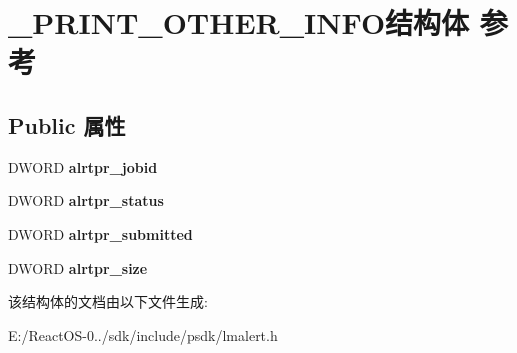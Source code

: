 \hypertarget{struct___p_r_i_n_t___o_t_h_e_r___i_n_f_o}{}\section{\+\_\+\+P\+R\+I\+N\+T\+\_\+\+O\+T\+H\+E\+R\+\_\+\+I\+N\+F\+O结构体 参考}
\label{struct___p_r_i_n_t___o_t_h_e_r___i_n_f_o}
\subsection*{Public 属性}
\begin{DoxyCompactItemize}
\item 
\mbox{\label{struct___p_r_i_n_t___o_t_h_e_r___i_n_f_o_a24254f1208283a9a54aa9f4e38cd9dd4}} 
D\+W\+O\+RD {\bfseries alrtpr\+\_\+jobid}
\item 
\mbox{\label{struct___p_r_i_n_t___o_t_h_e_r___i_n_f_o_adade3356e8018f015ed37f6183468260}} 
D\+W\+O\+RD {\bfseries alrtpr\+\_\+status}
\item 
\mbox{\label{struct___p_r_i_n_t___o_t_h_e_r___i_n_f_o_a295f48f0626482c4cfbc2fda5553f784}} 
D\+W\+O\+RD {\bfseries alrtpr\+\_\+submitted}
\item 
\mbox{\label{struct___p_r_i_n_t___o_t_h_e_r___i_n_f_o_a4e6f2685809c4ff2fee51065c1e5d513}} 
D\+W\+O\+RD {\bfseries alrtpr\+\_\+size}
\end{DoxyCompactItemize}


该结构体的文档由以下文件生成\+:\begin{DoxyCompactItemize}
\item 
E\+:/\+React\+O\+S-\/0../sdk/include/psdk/lmalert.\+h\end{DoxyCompactItemize}
